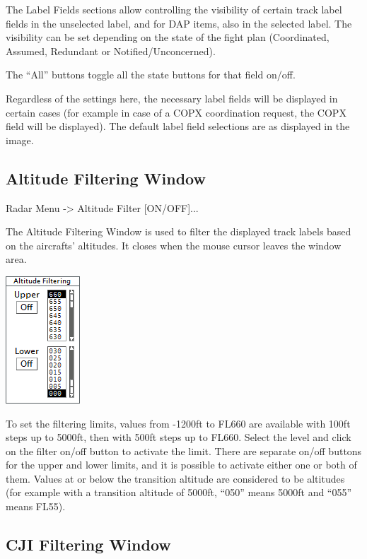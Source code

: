 \documentclass[11pt,a4paper]{memoir}
\begin{document}
The Label Fields sections allow controlling the visibility of certain track label fields in the unselected label, and for DAP items, also in the selected label. The visibility can be set depending on the state of the fight plan (Coordinated, Assumed, Redundant or Notified/Unconcerned).

The “All” buttons toggle all the state buttons for that field on/off.

Regardless of the settings here, the necessary label fields will be displayed in certain cases (for example in case of a COPX coordination request, the COPX field will be displayed). The default label field selections are as displayed in the image.

\subsection{Altitude Filtering Window}
\label{win:afw}

Radar Menu -> Altitude Filter [ON/OFF]...

The Altitude Filtering Window is used to filter the displayed track labels based on the aircrafts’ altitudes. It closes when the mouse cursor leaves the window area.

\includegraphics{img/altfil.png}

To set the filtering limits, values from -1200ft to FL660 are available with 100ft steps up to 5000ft, then with 500ft steps up to FL660. Select the level and click on the filter on/off button to activate the limit. There are separate on/off buttons for the upper and lower limits, and it is possible to activate either one or both of them. Values at or below the transition altitude are considered to be altitudes (for example with a transition altitude of 5000ft, “050” means 5000ft and “055” means FL55).

\subsection{CJI Filtering Window}
\label{win:cji}
\end{document}
